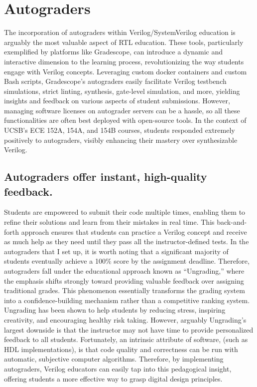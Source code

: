 
\chapter{Autograders}
\label{chapter:autograders}

The incorporation of autograders within Verilog/SystemVerilog education is arguably the most valuable aspect of RTL education.
These tools, particularly exemplified by platforms like Gradescope, can introduce a dynamic and interactive dimension to the learning process, revolutionizing the way students engage with Verilog concepts.
Leveraging custom docker containers and custom Bash scripts, Gradescope's autograders easily facilitate Verilog testbench simulations, strict linting, synthesis, gate-level simulation, and more, yielding insights and feedback on various aspects of student submissions.
However, managing software licenses on autograder servers can be a hassle, so all these functionalities are often best deployed with open-source tools.
In the context of UCSB's ECE 152A, 154A, and 154B courses, students responded extremely positively to autograders, visibly enhancing their mastery over synthesizable Verilog.

\section{Autograders offer instant, high-quality feedback.}

Students are empowered to submit their code multiple times, enabling them to refine their solutions and learn from their mistakes in real time.
This back-and-forth approach ensures that students can practice a Verilog concept and receive as much help as they need until they pass all the instructor-defined tests.
In the autograders that I set up, it is worth noting that a significant majority of students eventually achieve a 100\% score by the assignment deadline.
Therefore, autograders fall under the educational approach known as \enquote{Ungrading,} where the emphasis shifts strongly toward providing valuable feedback over assigning traditional grades.
This phenomenon essentially transforms the grading system into a confidence-building mechanism rather than a competitive ranking system.
Ungrading has been shown to help students by reducing stress, inspiring creativity, and encouraging healthy risk taking.
\cite{kohn:book, blum:article} However, arguably Ungrading's largest downside is that the instructor may not have time to provide personalized feedback to all students.
Fortunately, an intrinsic attribute of software, (such as HDL implementations), is that code quality and correctness can be run with automatic, subjective computer algorithms.
Therefore, by implementing autograders, Verilog educators can easily tap into this pedagogical insight, offering students a more effective way to grasp digital design principles.

